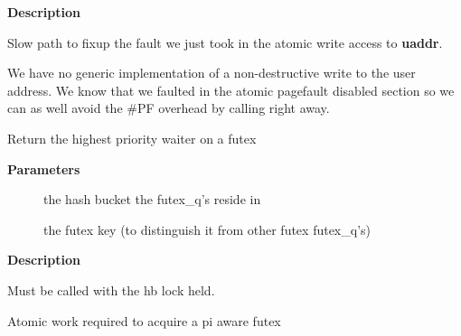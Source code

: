 \documentclass[a4paper,8pt,english]{sphinxmanual}
\begin{document}
\textbf{Description}

Slow path to fixup the fault we just took in the atomic write
access to \textbf{uaddr}.

We have no generic implementation of a non-destructive write to the
user address. We know that we faulted in the atomic pagefault
disabled section so we can as well avoid the \#PF overhead by
calling  right away.

\begin{fulllineitems}
\label{kernel-hacking/locking:c.futex_top_waiter}
Return the highest priority waiter on a futex

\end{fulllineitems}


\textbf{Parameters}
\begin{description}
\item[{}] \leavevmode
the hash bucket the futex\_q's reside in

\item[{}] \leavevmode
the futex key (to distinguish it from other futex futex\_q's)

\end{description}

\textbf{Description}

Must be called with the hb lock held.

\begin{fulllineitems}
\label{kernel-hacking/locking:c.futex_lock_pi_atomic}
Atomic work required to acquire a pi aware futex

\end{fulllineitems}
\end{document}
